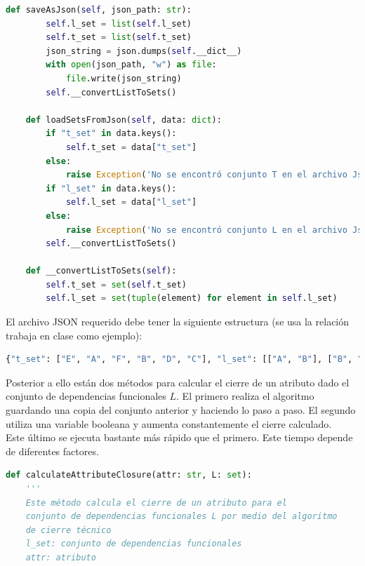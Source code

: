 \documentclass[a4paper,12pt]{article}
\begin{document}
{\begin{lstlisting}[language=python, caption={Clase que modela las relaciones.\\\hspace{\textwidth}}, captionpos=t]
    def saveAsJson(self, json_path: str):
        self.l_set = list(self.l_set)
        self.t_set = list(self.t_set)
        json_string = json.dumps(self.__dict__)
        with open(json_path, "w") as file:
            file.write(json_string)
        self.__convertListToSets()

    def loadSetsFromJson(self, data: dict):
        if "t_set" in data.keys():
            self.t_set = data["t_set"]
        else:
            raise Exception('No se encontró conjunto T en el archivo Json. "t_set"')
        if "l_set" in data.keys():
            self.l_set = data["l_set"]
        else:
            raise Exception('No se encontró conjunto L en el archivo Json. "l_set"')
        self.__convertListToSets()

    def __convertListToSets(self):
        self.t_set = set(self.t_set)
        self.l_set = set(tuple(element) for element in self.l_set)

\end{lstlisting}

El archivo JSON requerido debe tener la siguiente estructura (se usa la relación trabaja en clase como ejemplo):

\begin{lstlisting}[language=python, caption={Estructura del archivo JSON.\\\hspace{\textwidth}}, captionpos=t]
{"t_set": ["E", "A", "F", "B", "D", "C"], "l_set": [["A", "B"], ["B", "C"], ["B", "D"], ["C", "A"], ["A", "D"], ["AC", "E"], ["FB", "D"]]}
\end{lstlisting}

Posterior a ello están dos métodos para calcular el cierre de un atributo dado el conjunto de dependencias funcionales $L$. El primero realiza el algoritmo guardando una copia del conjunto anterior y haciendo lo paso a paso. El segundo utiliza una variable booleana y aumenta constantemente el cierre calculado. 
\\
Este último se ejecuta bastante más rápido que el primero. Este tiempo depende de diferentes factores.


\begin{lstlisting}[language=python, caption={Algoritmo que calcula el cierre de una atributo guardando su estado anterior.\\\hspace{\textwidth}}, captionpos=t]
def calculateAttributeClosure(attr: str, L: set):
    '''
    Este método calcula el cierre de un atributo para el
    conjunto de dependencias funcionales L por medio del algoritmo
    de cierre técnico
    l_set: conjunto de dependencias funcionales
    attr: atributo


\end{lstlisting}}
\end{document}
